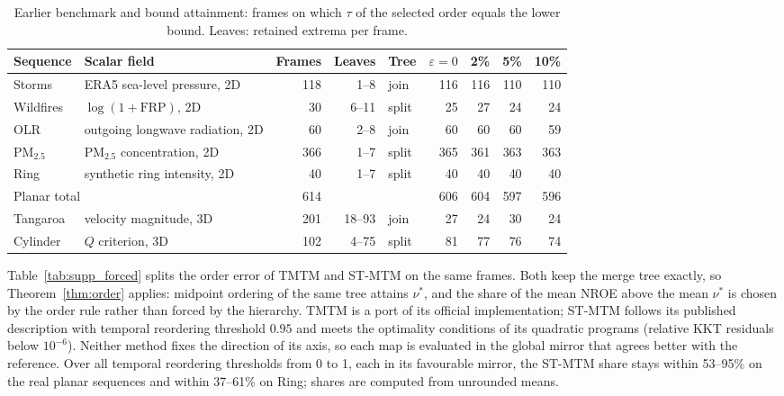 \documentclass{vgtc}                %
\begin{document}
\begin{table}[t]
\centering\small
\caption{Earlier benchmark and bound attainment: frames on which $\tau$ of the selected order equals the lower bound. Leaves: retained extrema per frame.}\label{tab:supp_bounds}
\begin{tabular}{llrrlrrrr}\toprule
Sequence & Scalar field & Frames & Leaves & Tree & $\varepsilon=0$ & 2\% & 5\% & 10\%\\\midrule
Storms & ERA5 sea-level pressure, 2D & 118 & 1--8 & join & 116 & 116 & 110 & 110\\
Wildfires & $\log(1+\mathrm{FRP})$, 2D & 30 & 6--11 & split & 25 & 27 & 24 & 24\\
OLR & outgoing longwave radiation, 2D & 60 & 2--8 & join & 60 & 60 & 60 & 59\\
PM$_{2.5}$ & PM$_{2.5}$ concentration, 2D & 366 & 1--7 & split & 365 & 361 & 363 & 363\\
Ring & synthetic ring intensity, 2D & 40 & 1--7 & split & 40 & 40 & 40 & 40\\\midrule
\multicolumn{2}{l}{Planar total} & 614 & & & 606 & 604 & 597 & 596\\\midrule
Tangaroa & velocity magnitude, 3D & 201 & 18--93 & join & 27 & 24 & 30 & 24\\
Cylinder & $Q$ criterion, 3D & 102 & 4--75 & split & 81 & 77 & 76 & 74\\\bottomrule
\end{tabular}
\end{table}

Table~\ref{tab:supp_forced} splits the order error of TMTM and ST-MTM on the same frames. Both keep the merge tree exactly, so Theorem~\ref{thm:order} applies: midpoint ordering of the same tree attains $\nu^*$, and the share of the mean NROE above the mean $\nu^*$ is chosen by the order rule rather than forced by the hierarchy. TMTM is a port of its official implementation; ST-MTM follows its published description with temporal reordering threshold $0.95$ and meets the optimality conditions of its quadratic programs (relative KKT residuals below $10^{-6}$). Neither method fixes the direction of its axis, so each map is evaluated in the global mirror that agrees better with the reference. Over all temporal reordering thresholds from 0 to 1, each in its favourable mirror, the ST-MTM share stays within 53--95\% on the real planar sequences and within 37--61\% on Ring; shares are computed from unrounded means.
\end{document}
